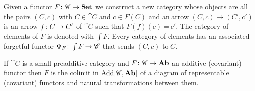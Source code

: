   \begin{definition}
    \label{def:category_of_elements}
    Given a functor \(F\colon {\mathscr C}\to \text{\normalfont\textbf{Set}}\) we construct a new category whose objects are all the pairs \((C,c)\) with \(C\in\cat{C}\) and \(c\in F(C)\) and an arrow \((C,c)\to(C',c')\) is an arrow \(f\colon C\to C'\) of \(\cat{C}\) such that \(F(f)(c)=c'\).
    The category of elements of \(F\) is denoted with \(\int F\).
    Every category of elements has an associated forgetful functor \(\Phi_{F}\colon \int F\to {\mathscr C}\) that sends \((C,c)\) to \(C\).
  \end{definition}

\begin{theorem}[density]
  \label{teo:density}
  If \(\cat{C}\) is a small preadditive category and \(F\colon {\mathscr C}\to \text{\normalfont\textbf{Ab}}\) an additive (covariant) functor then \(F\) is the colimit in \(\text{\normalfont Add}[{\mathscr C}, \text{\normalfont\textbf{Ab}}]\) of a diagram of representable (covariant) functors and natural transformations between them.
\end{theorem}

